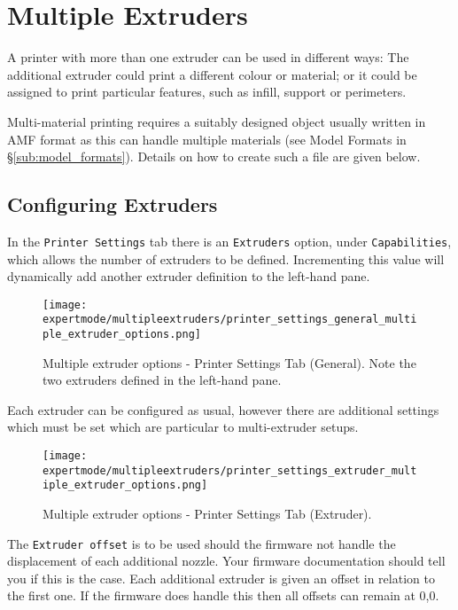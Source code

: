 
\section{Multiple Extruders} %
\label{sec:multiple_extruders}

A printer with more than one extruder can be used in different ways: The additional extruder could print a different colour or material; or it could be assigned to print particular features, such as infill, support or perimeters.  

Multi-material printing requires a suitably designed object usually written in AMF format as this can handle multiple materials (see Model Formats in §\ref{sub:model_formats}).  Details on how to create such a file are given below.


\subsection{Configuring Extruders} %
\label{sub:configuring_extruders}

In the \texttt{Printer Settings} tab there is an \texttt{Extruders} option, under \texttt{Capabilities}, which allows the number of extruders to be defined.  Incrementing this value will dynamically add another extruder definition to the left-hand pane.

\begin{figure}[H]
\centering
\texttt{[image: expertmode/multipleextruders/printer\_settings\_general\_multiple\_extruder\_options.png]}
\caption{Multiple extruder options - Printer Settings Tab (General).  Note the two extruders defined in the left-hand pane.}
\label{fig:printer_settings_general_multiple_extruder_options}
\end{figure}

Each extruder can be configured as usual, however there are additional settings which must be set which are particular to multi-extruder setups.  

\begin{figure}[H]
\centering
\texttt{[image: expertmode/multipleextruders/printer\_settings\_extruder\_multiple\_extruder\_options.png]}
\caption{Multiple extruder options - Printer Settings Tab (Extruder).}
\label{fig:printer_settings_extruder_multiple_extruder_options}
\end{figure}

The \texttt{Extruder offset} is to be used should the firmware not handle the displacement of each additional nozzle.  Your firmware documentation should tell you if this is the case.  Each additional extruder is given an offset in relation to the first one.  If the firmware does handle this then all offsets can remain at 0,0.

